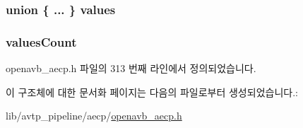 \subsubsection[{\texorpdfstring{values}{values}}]{\setlength{\rightskip}{0pt plus 5cm}union \{ ... \}   values}\hypertarget{structopenavb__aecp__response__data__get__control__t_a9411c1c1077eeefdaa1f763a8831b377}{}\label{structopenavb__aecp__response__data__get__control__t_a9411c1c1077eeefdaa1f763a8831b377}
\subsubsection[{\texorpdfstring{values\+Count}{valuesCount}}]{ values\+Count}\hypertarget{structopenavb__aecp__response__data__get__control__t_a264345a5327a88764d6dc9b6ad3abc1f}{}\label{structopenavb__aecp__response__data__get__control__t_a264345a5327a88764d6dc9b6ad3abc1f}


openavb\+\_\+aecp.\+h 파일의 313 번째 라인에서 정의되었습니다.



이 구조체에 대한 문서화 페이지는 다음의 파일로부터 생성되었습니다.\+:\begin{DoxyCompactItemize}
\item 
lib/avtp\+\_\+pipeline/aecp/\hyperlink{openavb__aecp_8h}{openavb\+\_\+aecp.\+h}\end{DoxyCompactItemize}
